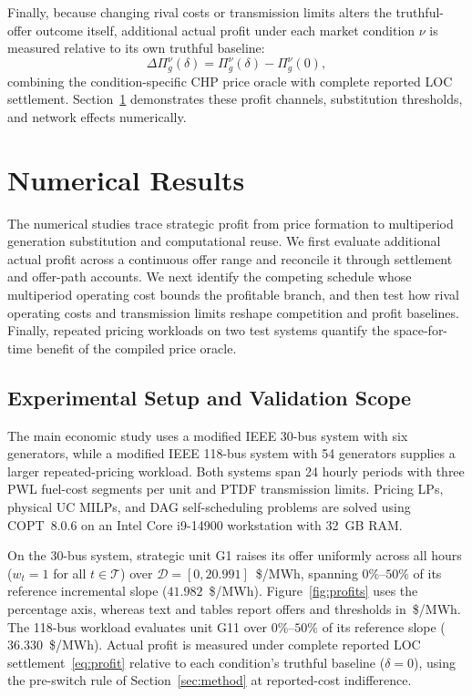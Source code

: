 \documentclass[journal]{IEEEtran}
\begin{document}
Finally, because changing rival costs or transmission limits alters the truthful-offer outcome itself, additional actual profit under each market condition $\nu$ is measured relative to its own truthful baseline:
\begin{equation}
\Delta\Pi_g^{\nu}(\delta) = \Pi_g^{\nu}(\delta) - \Pi_g^{\nu}(0),\label{eq:condition-profit}
\end{equation}
combining the condition-specific CHP price oracle with complete reported LOC settlement. Section~\ref{sec:results} demonstrates these profit channels, substitution thresholds, and network effects numerically.




\section{Numerical Results}\label{sec:results}

The numerical studies trace strategic profit from price formation to multiperiod generation substitution and computational reuse. We first evaluate additional actual profit across a continuous offer range and reconcile it through settlement and offer-path accounts. We next identify the competing schedule whose multiperiod operating cost bounds the profitable branch, and then test how rival operating costs and transmission limits reshape competition and profit baselines. Finally, repeated pricing workloads on two test systems quantify the space-for-time benefit of the compiled price oracle.

\subsection{Experimental Setup and Validation Scope}
The main economic study uses a modified IEEE 30-bus system with six generators, while a modified IEEE 118-bus system with 54 generators supplies a larger repeated-pricing workload. Both systems span 24 hourly periods with three PWL fuel-cost segments per unit and PTDF transmission limits. Pricing LPs, physical UC MILPs, and DAG self-scheduling problems are solved using COPT~8.0.6 on an Intel Core i9-14900 workstation with 32~GB RAM.

On the 30-bus system, strategic unit G1 raises its offer uniformly across all hours ($w_t=1$ for all $t\in\mathcal{T}$) over $\mathcal{D}=[0,20.991]$~\$/MWh, spanning $0\%$--$50\%$ of its reference incremental slope ($41.982$~\$/MWh). Figure~\ref{fig:profits} uses the percentage axis, whereas text and tables report offers and thresholds in~\$/MWh. The 118-bus workload evaluates unit G11 over $0\%$--$50\%$ of its reference slope ($36.330$~\$/MWh). Actual profit is measured under complete reported LOC settlement~\eqref{eq:profit} relative to each condition's truthful baseline ($\delta=0$), using the pre-switch rule of Section~\ref{sec:method} at reported-cost indifference.
\end{document}
